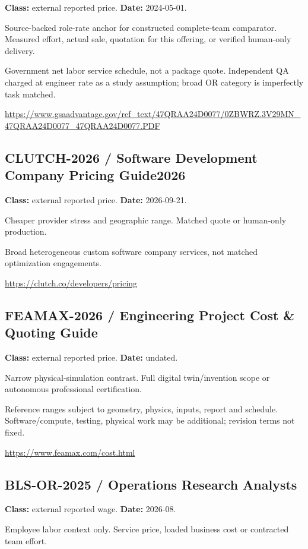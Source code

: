 \documentclass[10pt]{article}
\begin{document}
\textbf{Class:} external reported price. \textbf{Date:} 2024-05-01.

Source-backed role-rate anchor for constructed complete-team comparator. Measured effort, actual sale, quotation for this offering, or verified human-only delivery.

Government net labor service schedule, not a package quote. Independent QA charged at engineer rate as a study assumption; broad OR category is imperfectly task matched.

\url{https://www.gsaadvantage.gov/ref_text/47QRAA24D0077/0ZBWRZ.3V29MN_47QRAA24D0077_47QRAA24D0077.PDF}

\subsection*{CLUTCH-2026 / Software Development Company Pricing Guide2026}

\textbf{Class:} external reported price. \textbf{Date:} 2026-09-21.

Cheaper provider stress and geographic range. Matched quote or human-only production.

Broad heterogeneous custom software company services, not matched optimization engagements.

\url{https://clutch.co/developers/pricing}

\subsection*{FEAMAX-2026 / Engineering Project Cost \& Quoting Guide}

\textbf{Class:} external reported price. \textbf{Date:} undated.

Narrow physical-simulation contrast. Full digital twin/invention scope or autonomous professional certification.

Reference ranges subject to geometry, physics, inputs, report and schedule. Software/compute, testing, physical work may be additional; revision terms not fixed.

\url{https://www.feamax.com/cost.html}

\subsection*{BLS-OR-2025 / Operations Research Analysts}

\textbf{Class:} external reported wage. \textbf{Date:} 2026-08.

Employee labor context only. Service price, loaded business cost or contracted team effort.
\end{document}
